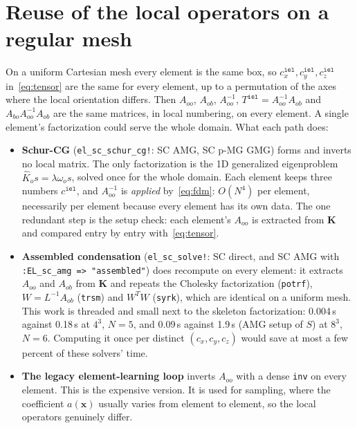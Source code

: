 \documentclass[11pt]{article}
\newcommand{\iel}{\mathtt{iel}}
\newcommand{\K}{\mathbf{K}}
\newcommand{\Khat}{\widehat{K}}
\newcommand{\What}{\widehat{\omega}}
\newcommand{\code}[1]{\texttt{#1}}
\begin{document}
\section{Reuse of the local operators on a regular mesh}\label{sec:reuse}
On a uniform Cartesian mesh every element is the same box, so $c^{\iel}_x,c^{\iel}_y,c^{\iel}_z$ in~\eqref{eq:tensor}
are the same for every element, up to a permutation of the axes where the local orientation differs. Then
$A_{oo}$, $A_{ob}$, $A_{oo}^{-1}$, $T^{\iel}=A_{oo}^{-1}A_{ob}$ and $A_{bo}A_{oo}^{-1}A_{ob}$ are the same matrices, in local
numbering, on every element. A single element's factorization could serve the whole domain. What each path does:
\begin{itemize}
  \item \textbf{Schur-CG} (\code{el\_sc\_schur\_cg!}: SC AMG, SC p-MG GMG) forms and inverts no local matrix. The only
        factorization is the 1D generalized eigenproblem $\Khat_o s=\lambda\What_o s$, solved once for the whole
        domain. Each element keeps three numbers $c^{\iel}$, and $A_{oo}^{-1}$ is \emph{applied}
        by~\eqref{eq:fdm}: $O(N^4)$ per element, necessarily per element because every element has its own data.
        The one redundant step is the setup check: each element's $A_{oo}$ is extracted from $\K$ and compared
        entry by entry with~\eqref{eq:tensor}.
  \item \textbf{Assembled condensation} (\code{el\_sc\_solve!}: SC direct, and SC AMG with
        \code{:EL\_sc\_amg => "assembled"}) does recompute on every element: it extracts $A_{oo}$ and $A_{ob}$ from $\K$
        and repeats the Cholesky factorization (\code{potrf}), $W=L^{-1}A_{ob}$ (\code{trsm}) and $W^TW$ (\code{syrk}),
        which are identical on a uniform mesh. This work is threaded and small next to the skeleton
        factorization: 0.004\,s against 0.18\,s at $4^3$, $N=5$, and 0.09\,s against 1.9\,s (AMG setup of $S$) at
        $8^3$, $N=6$. Computing it once per distinct $(c_x,c_y,c_z)$ would save at most a few percent of these
        solvers' time.
  \item \textbf{The legacy element-learning loop} inverts $A_{oo}$ with a dense \code{inv} on every element. This is the
        expensive version. It is used for sampling, where the coefficient $a(\mathbf{x})$ usually varies from element
        to element, so the local operators genuinely differ.
\end{itemize}
\end{document}
